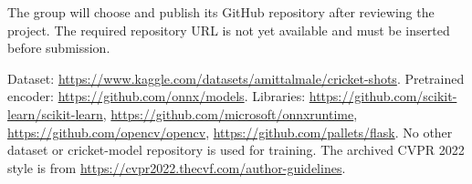 The group will choose and publish its GitHub repository after reviewing the project. The required repository URL is not yet available and must be inserted before submission.

Dataset: \url{https://www.kaggle.com/datasets/amittalmale/cricket-shots}. Pretrained encoder: \url{https://github.com/onnx/models}. Libraries: \url{https://github.com/scikit-learn/scikit-learn}, \url{https://github.com/microsoft/onnxruntime}, \url{https://github.com/opencv/opencv}, \url{https://github.com/pallets/flask}. No other dataset or cricket-model repository is used for training. The archived CVPR 2022 style is from \url{https://cvpr2022.thecvf.com/author-guidelines}.
